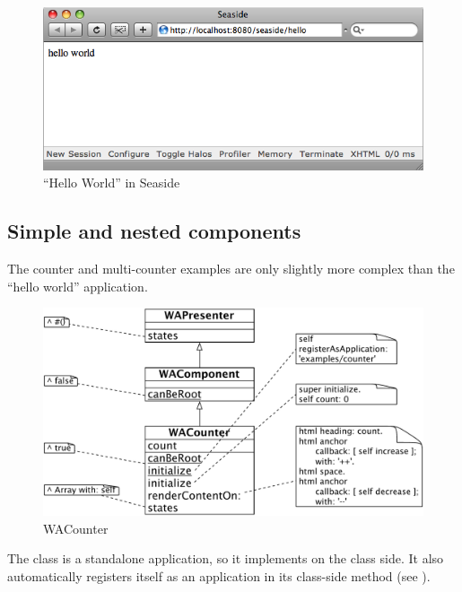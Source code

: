 \documentclass[a4paper,10pt,twoside]{book}
\begin{document}
\begin{figure}[ht]
\begin{center}
\includegraphics[width=\textwidth]{WAHelloWorld}
\caption{``Hello World'' in Seaside}
\label{fig:WAHelloWorld}
\end{center}
\end{figure}

\subsection{Simple and nested components}

The counter and multi-counter examples are only slightly more complex than the ``hello world'' application.

\begin{figure}[ht]
\begin{center}
\includegraphics[width=\textwidth]{WACounter}
\caption{WACounter}
\label{fig:WACounter}
\end{center}
\end{figure}

The class  is a standalone application, so it implements  on the class side.
It also automatically registers itself as an application in its class-side  method (see ).
\end{document}
